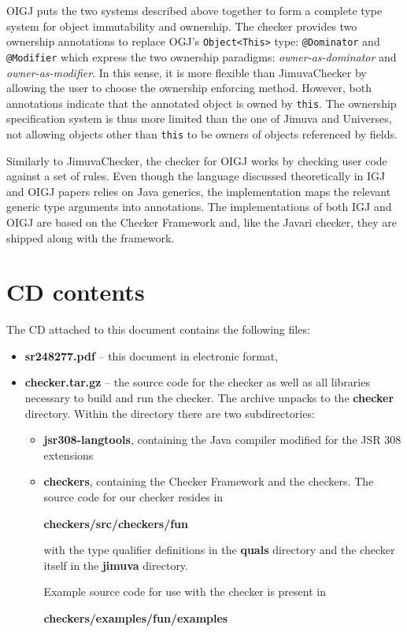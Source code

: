 \documentclass{pracamgr}
\theoremstyle{break}
\theoremstyle{break}
\theoremstyle{break}
\begin{document}
OIGJ puts the two systems described above together to form a complete
type system for object immutability and ownership. The checker
provides two ownership annotations to replace OGJ's
\texttt{Object<This>} type: \texttt{@Dominator} and \texttt{@Modifier}
which express the two ownership paradigms: \emph{owner-as-dominator}
and \emph{owner-as-modifier}. In this sense, it is more flexible than
JimuvaChecker by allowing the user to choose the ownership enforcing
method. However, both annotations indicate that the annotated object
is owned by \texttt{this}. The ownership specification system is thus
more limited than the one of Jimuva and Universes, not allowing
objects other than \texttt{this} to be owners of objects referenced by
fields.

Similarly to JimuvaChecker, the checker for OIGJ works by checking
user code against a set of rules. Even though the language discussed
theoretically in IGJ and OIGJ papers relies on Java generics, the
implementation maps the relevant generic type arguments into
annotations. The implementations of both IGJ and OIGJ are based on the
Checker Framework and, like the Javari checker, they are shipped along
with the framework.

\appendix


\chapter{CD contents}
\label{chap:cd}

The CD attached to this document contains the following files: 
\begin{itemize}
\item \textbf{sr248277.pdf} -- this document in electronic format,
\item \textbf{checker.tar.gz} -- the source code for the checker as
  well as all libraries necessary to build and run the checker. The
  archive unpacks to the \textbf{checker} directory. Within the
  directory there are two subdirectories:
  \begin{itemize}
  \item \textbf{jsr308-langtools}, containing the Java compiler
    modified for the JSR 308 extensions
  \item \textbf{checkers}, containing the Checker Framework and the
    checkers. The source code for our checker resides in
    \begin{center}
      \textbf{checkers/src/checkers/fun}
    \end{center}
    with the type qualifier definitions in the \textbf{quals}
    directory and the checker itself in the \textbf{jimuva} directory.

    Example source code for use with the checker is present in
    \begin{center}
      \textbf{checkers/examples/fun/examples}
    \end{center}
  \end{itemize}
\end{itemize}
\end{document}
